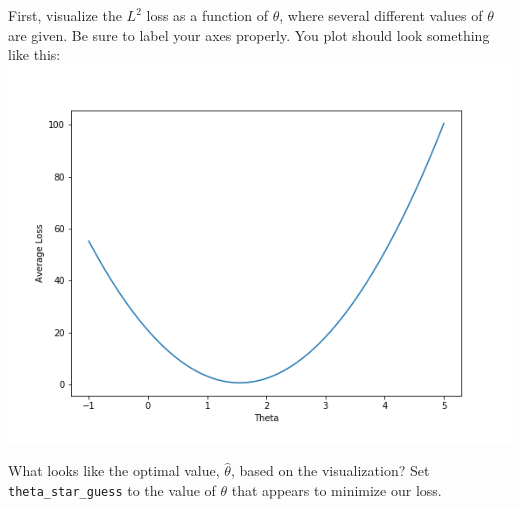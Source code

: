 \documentclass[11pt]{article}
\makeatletter
\def\maxwidth{\ifdim\Gin@nat@width>\linewidth\linewidth
    \else\Gin@nat@width\fi}
\let\Oldincludegraphics\includegraphics
\renewcommand{\includegraphics}[1]{\Oldincludegraphics[width=.8\maxwidth]{#1}}
\makeatother
\begin{document}
First, visualize the \(L^2\) loss as a function of \(\theta\), where
several different values of \(\theta\) are given. Be sure to label your
axes properly. You plot should look something like this:
\includegraphics{l2_avg_loss.png}

What looks like the optimal value, \(\hat{\theta}\), based on the
visualization? Set \texttt{theta\_star\_guess} to the value of
\(\theta\) that appears to minimize our loss.
\end{document}
